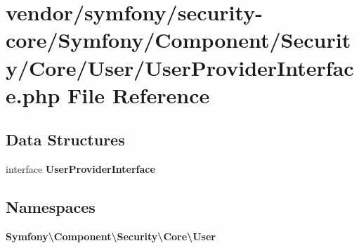 \section{vendor/symfony/security-\/core/\+Symfony/\+Component/\+Security/\+Core/\+User/\+User\+Provider\+Interface.php File Reference}
\label{_user_provider_interface_8php}
\subsection*{Data Structures}
\begin{DoxyCompactItemize}
\item 
interface {\bf User\+Provider\+Interface}
\end{DoxyCompactItemize}
\subsection*{Namespaces}
\begin{DoxyCompactItemize}
\item 
 {\bf Symfony\textbackslash{}\+Component\textbackslash{}\+Security\textbackslash{}\+Core\textbackslash{}\+User}
\end{DoxyCompactItemize}
